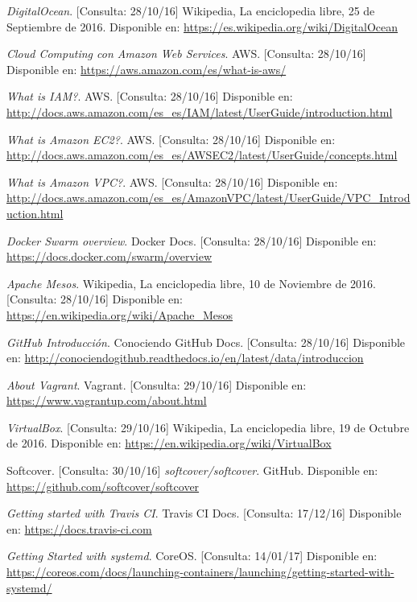 \begin{thebibliography}{9}
\textit{DigitalOcean}. [Consulta: 28/10/16]
Wikipedia, La enciclopedia libre, 25 de Septiembre de 2016.
Disponible en: \url{https://es.wikipedia.org/wiki/DigitalOcean}

\textit{Cloud Computing con Amazon Web Services}. 
AWS. [Consulta: 28/10/16]
Disponible en: \url{https://aws.amazon.com/es/what-is-aws/}

\textit{What is IAM?}. 
AWS. [Consulta: 28/10/16]
Disponible en: \url{http://docs.aws.amazon.com/es_es/IAM/latest/UserGuide/introduction.html}

\textit{What is Amazon EC2?}. 
AWS. [Consulta: 28/10/16]
Disponible en: \url{http://docs.aws.amazon.com/es_es/AWSEC2/latest/UserGuide/concepts.html}

\textit{What is Amazon VPC?}. 
AWS. [Consulta: 28/10/16]
Disponible en: \url{http://docs.aws.amazon.com/es_es/AmazonVPC/latest/UserGuide/VPC_Introduction.html}

\textit{Docker Swarm overview}. 
Docker Docs. [Consulta: 28/10/16]
Disponible en: \url{https://docs.docker.com/swarm/overview}

\textit{Apache Mesos}. 
Wikipedia, La enciclopedia libre, 10 de Noviembre de 2016. [Consulta: 28/10/16]
Disponible en: \url{https://en.wikipedia.org/wiki/Apache\_Mesos}

\textit{GitHub Introducción}. 
Conociendo GitHub Docs. [Consulta: 28/10/16]
Disponible en: \url{http://conociendogithub.readthedocs.io/en/latest/data/introduccion}

\textit{About Vagrant}. 
Vagrant. [Consulta: 29/10/16]
Disponible en: \url{https://www.vagrantup.com/about.html}

\textit{VirtualBox}. [Consulta: 29/10/16]
Wikipedia, La enciclopedia libre, 19 de Octubre de 2016.
Disponible en: \url{https://en.wikipedia.org/wiki/VirtualBox}

Softcover. [Consulta: 30/10/16]
\textit{softcover/softcover}. GitHub.
Disponible en: \url{https://github.com/softcover/softcover}

\textit{Getting started with Travis CI}. 
Travis CI Docs. [Consulta: 17/12/16]
Disponible en: \url{https://docs.travis-ci.com}

\textit{Getting Started with systemd}. 
CoreOS. [Consulta: 14/01/17]
Disponible en: \url{https://coreos.com/docs/launching-containers/launching/getting-started-with-systemd/}


\end{thebibliography}
